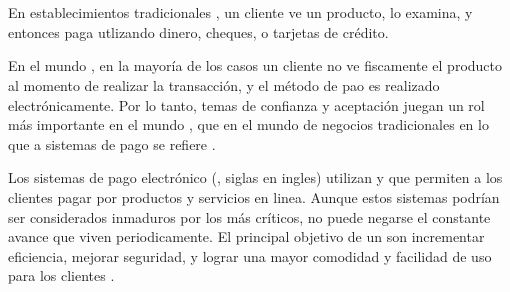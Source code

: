 \section{\paymentsCOM}\label{chapter:solucionimplementada:section:payment}

En establecimientos tradicionales \brickandmortar , un cliente ve un producto, lo examina, y entonces paga utlizando dinero, cheques, o tarjetas de crédito.

En el mundo \ecommerceCOM, en la mayoría de los casos un cliente no ve fiscamente el producto al momento de realizar la transacción, y el método de pao es realizado electrónicamente. Por lo tanto, temas de confianza y aceptación juegan un rol más importante en el mundo \ecommerceCOM, que en el mundo de negocios tradicionales en lo que a sistemas de pago se refiere \cite{bidgoli2002electronic}.

Los sistemas de pago electrónico (\epsSiglasCOM, siglas en ingles) utilizan \hardwarePC y \softwarePC que permiten a los clientes pagar por productos y servicios en linea. Aunque estos sistemas podrían ser considerados inmaduros por los más críticos, no puede negarse el constante avance que viven periodicamente. El principal objetivo de un \epsSiglasCOM son incrementar eficiencia, mejorar seguridad, y lograr una mayor comodidad y facilidad de uso para los clientes \cite{bidgoli2002electronic}.



\subsection{\paypalNAME}


